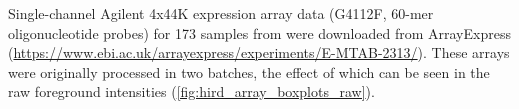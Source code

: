 %
Single-channel Agilent 4x44K expression array data (G4112F, 60-mer oligonucleotide probes) for 173 samples from \textcite{sobolev2016AdjuvantedInfluenzaH1N1Vaccination} were downloaded from ArrayExpress (\url{https://www.ebi.ac.uk/arrayexpress/experiments/E-MTAB-2313/}).
These arrays were originally processed in two batches, the effect of which can be seen in the raw foreground intensities (\cref{fig:hird_array_boxplots_raw}).

